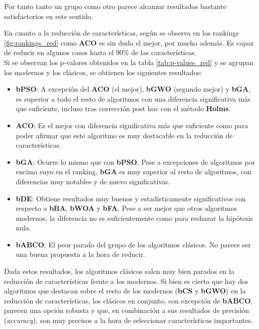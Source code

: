 Por tanto tanto un grupo como otro parece alcanzar resultados bastante satisfactorios en este sentido.

En cuanto a la reducción de características, según se observa en los rankings \ref{fig:rankings_red} como \textbf{ACO} es sin duda el mejor, por mucho además. Es capaz de reducir en algunos casos hasta el $90\%$ de las características.\\[6pt]
Si se observan los p-valores obtenidos en la tabla \ref{tab:p-values_red} y se agrupan los modernos y los clásicos, se obtienen los siguientes resultados:
\begin{itemize}
    \item \textbf{bPSO}: A excepción del \textbf{ACO} (el mejor), \textbf{bGWO} (segundo mejor) y \textbf{bGA}, es superior a todo el resto de algoritmos con una diferencia significativa más que suficiente, incluso tras corrección post hoc con el método \textbf{Holms}.
    \item \textbf{ACO}: Es el mejor con diferencia significativa más que suficiente como para poder afirmar que este algoritmo es muy destacable en la reducción de características.
    \item \textbf{bGA}: Ocurre lo mismo que con \textbf{bPSO}. Pese a excepciones de algoritmos por encima suyo en el ranking, \textbf{bGA} es muy superior al resto de algoritmos, con diferencias muy notables y de nuevo significativas.
    \item \textbf{bDE}: Obtiene resultados muy buenos y estadísticamente significativos con respecto a \textbf{bBA}, \textbf{bWOA} y \textbf{bFA}. Pese a ser mejor que otros algoritmos modernos, la diferencia no es suficientemente como para rechazar la hipótesis nula.
    \item \textbf{bABCO}: El peor parado del grupo de los algoritmos clásicos. No parece ser una buena propuesta a la hora de reducir.
\end{itemize}

Dada estos resultados, los algoritmos clásicos salen muy bien parados en la reducción de características frente a los modernos. Si bien es cierto que hay dos algoritmos que destacan sobre el resto de los modernos (\textbf{bCS} y \textbf{bGWO}) en la reducción de características, los clásicos en conjunto, con excepción de \textbf{bABCO}, parecen una opción robusta y que, en combinación a sus resultados de precisión (\textit{accuracy}), son muy precisos a la hora de seleccionar características importantes.

